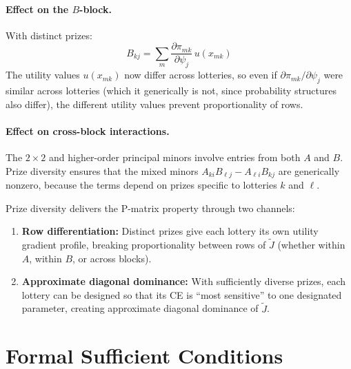 \documentclass[11pt,a4paper]{article}
\theoremstyle{definition}
\begin{document}
\paragraph{Effect on the $B$-block.}
With distinct prizes:
\begin{equation}
    B_{kj} = \sum_{m}
    \frac{\partial \pi_{mk}}{\partial \psi_j} \, u(x_{mk})
\end{equation}
The utility values $u(x_{mk})$ now differ across lotteries, so even if
$\partial\pi_{mk}/\partial\psi_j$ were similar across lotteries (which it
generically is not, since probability structures also differ), the different
utility values prevent proportionality of rows.

\paragraph{Effect on cross-block interactions.}
The $2 \times 2$ and higher-order principal minors involve entries from both
$A$ and $B$. Prize diversity ensures that the mixed minors
$A_{ki} B_{\ell j} - A_{\ell i} B_{kj}$ are generically nonzero, because the
terms depend on prizes specific to lotteries $k$ and $\ell$.

\begin{keyresult}
Prize diversity delivers the P-matrix property through two channels:
\begin{enumerate}
    \item \textbf{Row differentiation:} Distinct prizes give each lottery its
    own utility gradient profile, breaking proportionality between rows of
    $\widetilde{J}$ (whether within $A$, within $B$, or across blocks).

    \item \textbf{Approximate diagonal dominance:} With sufficiently diverse
    prizes, each lottery can be designed so that its CE is ``most sensitive'' to
    one designated parameter, creating approximate diagonal dominance of
    $\widetilde{J}$.
\end{enumerate}
\end{keyresult}


\section{Formal Sufficient Conditions}
\label{sec:main_theorem}
\end{document}
